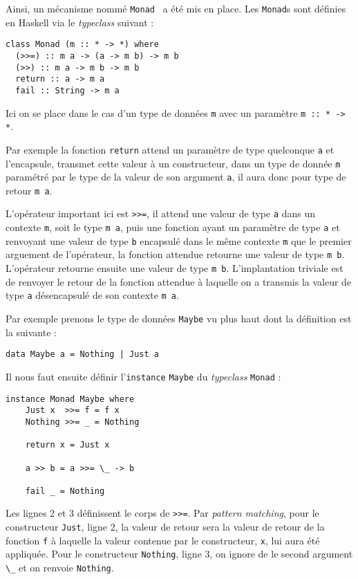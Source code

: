 \documentclass{llncs}
\begin{document}
Ainsi, un mécanisme nommé \lstinline{Monad}~\cite{Wadler90} a été mis en place.
Les \lstinline{Monad}s sont définies en Haskell via le \emph{typeclass} suivant :
\begin{lstlisting}
class Monad (m :: * -> *) where
  (>>=) :: m a -> (a -> m b) -> m b
  (>>) :: m a -> m b -> m b
  return :: a -> m a
  fail :: String -> m a
\end{lstlisting}

Ici on se place dans le cas d'un type de données \lstinline{m} avec un paramètre
\lstinline{m :: * -> *}.

Par exemple la fonction \lstinline{return} attend un paramètre de type quelconque
\lstinline{a} et l'encapsule, transmet cette valeur à un constructeur, dans
un type de donnée \lstinline{m} paramétré par le type de la valeur de son argument
\lstinline{a}, il aura donc pour type de retour \lstinline{m a}.

L'opérateur important ici est \lstinline{>>=}, il attend une valeur de type
\lstinline{a} dans un contexte \lstinline{m}, soit
le type \lstinline{m a}, puis une fonction ayant un paramètre de type \lstinline{a}
et renvoyant une valeur de type \lstinline{b} encapsulé dans le même contexte \lstinline{m}
que le premier arguement de l'opérateur, la fonction attendue retourne
une valeur de type \lstinline{m b}. L'opérateur retourne ensuite une valeur de
type \lstinline{m b}.
L'implantation triviale est de renvoyer le retour de la fonction attendue à
laquelle on a transmis la valeur de type \lstinline{a} désencapsulé de son contexte
\lstinline{m a}.

Par exemple prenons le type de données \lstinline{Maybe} vu plus haut dont la définition
est la suivante :
\begin{lstlisting}
data Maybe a = Nothing | Just a
\end{lstlisting}

Il nous faut ensuite définir l'\lstinline{instance} \lstinline{Maybe} du \emph{typeclass}
\lstinline{Monad} :
\begin{lstlisting}
instance Monad Maybe where
    Just x  >>= f = f x
    Nothing >>= _ = Nothing

    return x = Just x

    a >> b = a >>= \_ -> b

    fail _ = Nothing
\end{lstlisting}

Les lignes 2 et 3 définissent le corps de \lstinline{>>=}.
Par \emph{pattern matching}, pour le constructeur \lstinline{Just}, ligne 2,
la valeur de retour sera la valeur de retour de la fonction \lstinline{f} à
laquelle la valeur contenue par le constructeur, \lstinline{x}, lui aura été appliquée.
Pour le constructeur \lstinline{Nothing}, ligne 3, on ignore de le second argument
\lstinline{\_} et on renvoie \lstinline{Nothing}.
\end{document}

